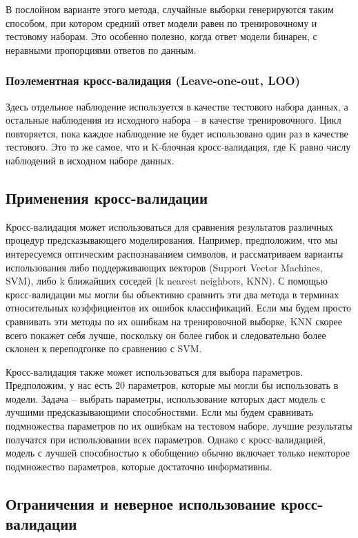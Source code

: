 \documentclass[a4paper, 12pt]{article}
\theoremstyle{plain} %
\theoremstyle{definition} %
\theoremstyle{remark} %
\begin{document}
В послойном варианте этого метода, случайные выборки генерируются таким способом, при котором средний ответ модели равен по тренировочному и тестовому наборам. Это особенно полезно, когда ответ модели бинарен, с неравными пропорциями ответов по данным.

\subsubsection{Поэлементная кросс-валидация (Leave-one-out, LOO)}

Здесь отдельное наблюдение используется в качестве тестового набора данных, а остальные наблюдения из исходного набора – в качестве тренировочного. Цикл повторяется, пока каждое наблюдение не будет использовано один раз в качестве тестового. Это то же самое, что и K-блочная кросс-валидация, где K равно числу наблюдений в исходном наборе данных.

\subsection{Применения кросс-валидации}

Кросс-валидация может использоваться для сравнения результатов различных процедур предсказывающего моделирования. Например, предположим, что мы интересуемся оптическим распознаванием символов, и рассматриваем варианты использования либо поддерживающих векторов (Support Vector Machines, SVM), либо k ближайших соседей (k nearest neighbors, KNN). С помощью кросс-валидации мы могли бы объективно сравнить эти два метода в терминах относительных коэффициентов их ошибок классификаций. Если мы будем просто сравнивать эти методы по их ошибкам на тренировочной выборке, KNN скорее всего покажет себя лучше, поскольку он более гибок и следовательно более склонен к переподгонке по сравнению с SVM.

Кросс-валидация также может использоваться для выбора параметров. Предположим, у нас есть 20 параметров, которые мы могли бы использовать в модели. Задача – выбрать параметры, использование которых даст модель с лучшими предсказывающими способностями. Если мы будем сравнивать подмножества параметров по их ошибкам на тестовом наборе, лучшие результаты получатся при использовании всех параметров. Однако с кросс-валидацией, модель с лучшей способностью к обобщению обычно включает только некоторое подмножество параметров, которые достаточно информативны.

\subsection{Ограничения и неверное использование кросс-валидации}
\end{document}
